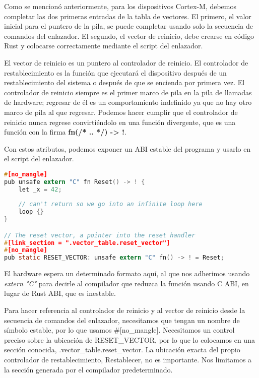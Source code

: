 Como se mencionó anteriormente, para los dispositivos Cortex-M, debemos completar las dos primeras entradas de la tabla de vectores. El primero, el valor inicial para el puntero de la pila, se puede completar usando solo la secuencia de comandos del enlazador. El segundo, el vector de reinicio, debe crearse en código Rust y colocarse correctamente mediante el script del enlazador.

El vector de reinicio es un puntero al controlador de reinicio. El controlador de restablecimiento es la función que ejecutará el dispositivo después de un restablecimiento del sistema o después de que se encienda por primera vez. El controlador de reinicio siempre es el primer marco de pila en la pila de llamadas de hardware; regresar de él es un comportamiento indefinido ya que no hay otro marco de pila al que regresar. Podemos hacer cumplir que el controlador de reinicio nunca regrese convirtiéndolo en una función divergente, que es una función con la firma \textbf{fn(/* .. */) -> !}.



Con estos atributos, podemos exponer un ABI estable del programa y usarlo en el script del enlazador.


\begin{lstlisting}[language=c]
#[no_mangle]
pub unsafe extern "C" fn Reset() -> ! {
	let _x = 42;
	
	// can't return so we go into an infinite loop here
	loop {}
}

// The reset vector, a pointer into the reset handler
#[link_section = ".vector_table.reset_vector"]
#[no_mangle]
pub static RESET_VECTOR: unsafe extern "C" fn() -> ! = Reset;
\end{lstlisting}


El hardware espera un determinado formato aquí, al que nos adherimos usando \textit{extern "C"}  para decirle al compilador que reduzca la función usando C ABI, en lugar de Rust ABI, que es inestable.

Para hacer referencia al controlador de reinicio y al vector de reinicio desde la secuencia de comandos del enlazador, necesitamos que tengan un nombre de símbolo estable, por lo que usamos \#[no\_mangle]. Necesitamos un control preciso sobre la ubicación de RESET\_VECTOR, por lo que lo colocamos en una sección conocida, .vector\_table.reset\_vector. La ubicación exacta del propio controlador de restablecimiento, Restablecer, no es importante. Nos limitamos a la sección generada por el compilador predeterminado.

